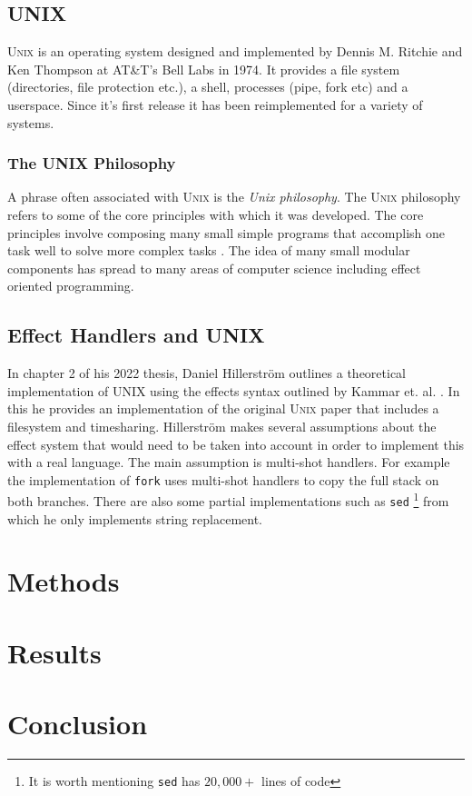 \documentclass[logo,bsc,singlespacing,parskip]{infthesis}
\begin{document}
\section{\textsc{UNIX}}

\textsc{Unix} \cite{ritchie1978unix} is an operating system designed and
implemented by Dennis M. Ritchie and Ken Thompson at AT\&T's Bell Labs in 1974.
It provides a file system (directories, file protection etc.), a shell,
processes (pipe, fork etc) and a userspace. Since it's first release it has been
reimplemented for a variety of systems.

\subsection{The UNIX Philosophy}

A phrase often associated with \textsc{Unix} is the \emph{Unix philosophy}.  The
\textsc{Unix} philosophy refers to some of the core principles with which it was
developed. The core principles involve composing many small simple programs that
accomplish one task well to solve more complex tasks \cite{raymond2003art}. The
idea of many small modular components has spread to many areas of computer
science including effect oriented programming.

\section{Effect Handlers and UNIX}

In chapter 2 of his 2022 thesis, Daniel Hillerstr\"{o}m
\cite{hillerstrom2022foundations} outlines a theoretical implementation of UNIX
using the effects syntax outlined by Kammar et. al. \cite{kammar2013handlers}.
In this he provides an implementation of the original \textsc{Unix} paper
\cite{ritchie1978unix} that includes a filesystem and timesharing.
Hillerstr\"{o}m makes several assumptions about the effect system that would
need to be taken into account in order to implement this with a real language.
The main assumption is multi-shot handlers. For example the implementation of
\texttt{fork} uses multi-shot handlers to copy the full stack on both branches.
There are also some partial implementations such as \texttt{sed} \footnote{It is
worth mentioning \texttt{sed} has $20,000+$ lines of code} from which he only
implements string replacement.

\chapter{Methods}

\chapter{Results}

\chapter{Conclusion}



\end{document}
